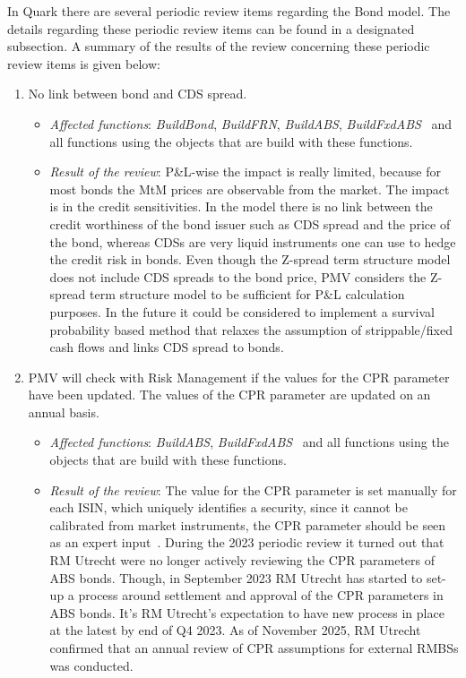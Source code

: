 \documentclass[reviewdoc]{pmv_report}  %
\begin{document}
In Quark there are several periodic review items regarding the Bond model. The details regarding these periodic review items can be found in a designated subsection.
A summary of the results of the review concerning these periodic review items is given below:
\begin{enumerate}
  \item No link between bond and CDS spread.
  \begin{itemize}
    \item \textit{Affected functions}: \textit{BuildBond}, \textit{BuildFRN}, \textit{BuildABS}, \textit{BuildFxdABS}~\cite{Quark.BondLibrary} and all functions using the objects that are build with these functions.
    \item \textit{Result of the review}: P\&L-wise the impact is really limited, because for most bonds the MtM prices are observable from the market.
The impact is in the credit sensitivities.
In the model there is no link between the credit worthiness of the bond issuer such as CDS spread and the price of the bond, whereas CDSs are very liquid instruments one can use to hedge the credit risk in bonds.
Even though the Z-spread term structure model does not include CDS spreads to the bond price, PMV considers the Z-spread term structure model to be sufficient for P\&L calculation purposes.
In the future it could be considered to implement a survival probability based method that relaxes the assumption of strippable/fixed cash flows and links CDS spread to bonds.
  \end{itemize}
  \item PMV will check with Risk Management if the values for the CPR parameter have been updated. The values of the CPR parameter are updated on an annual basis.
  \begin{itemize}
    \item \textit{Affected functions}: \textit{BuildABS}, \textit{BuildFxdABS}~\cite{Quark.BondLibrary} and all functions using the objects that are build with these functions.
    \item \textit{Result of the review}:
    The value for the CPR parameter is set manually for each ISIN, which uniquely identifies a security,  since it cannot be calibrated from market instruments, the CPR parameter should be seen as an expert input~\cite{Quark.BondLibrary}. During the 2023 periodic review it turned out that RM Utrecht were no longer  actively reviewing the CPR parameters of ABS bonds. Though, in September 2023 RM Utrecht has started to set-up a process around settlement and approval of the CPR parameters in ABS bonds. It's RM Utrecht's expectation to have new process in place at the latest by end of Q4 2023. As of November 2025, RM Utrecht confirmed that an annual review of CPR assumptions for external RMBSs was conducted.

\end{itemize}
\end{enumerate}
\end{document}
